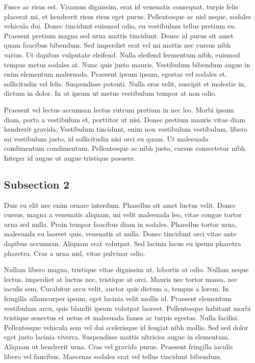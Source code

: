Fusce ac risus est. Vivamus dignissim, erat id venenatis consequat, turpis felis placerat mi, et hendrerit risus risus
eget purus. Pellentesque ac nisl neque, sodales vehicula dui. Donec tincidunt euismod odio, eu vestibulum tellus pretium
eu. Praesent pretium magna sed urna mattis tincidunt. Donec id purus sit amet quam faucibus bibendum. Sed imperdiet erat
vel mi mattis nec cursus nibh varius. Ut dapibus vulputate eleifend. Nulla eleifend fermentum nibh, euismod tempus metus
sodales at. Nunc quis justo mauris. Vestibulum bibendum augue in enim elementum malesuada. Praesent ipsum ipsum, egestas
vel sodales et, sollicitudin vel felis. Suspendisse potenti. Nulla eros velit, suscipit et molestie in, dictum in dolor.
In ut ipsum ut metus vestibulum tempor at non odio.

Praesent vel lectus accumsan lectus rutrum pretium in nec leo. Morbi ipsum diam, porta a vestibulum et, porttitor ut
nisi. Donec pretium mauris vitae diam hendrerit gravida. Vestibulum tincidunt, enim non vestibulum vestibulum, libero mi
vestibulum justo, id sollicitudin nisi orci eu quam. Ut malesuada condimentum condimentum. Pellentesque ac nibh justo,
cursus consectetur nibh. Integer id augue ut augue tristique posuere.

\subsection{Subsection 2}
Duis eu elit nec enim ornare interdum. Phasellus sit amet luctus velit. Donec cursus, magna a venenatis aliquam, mi
velit malesuada leo, vitae congue tortor urna sed nulla. Proin tempor faucibus diam in sodales. Phasellus tortor urna,
malesuada eu laoreet quis, venenatis at nulla. Donec tincidunt orci vitae ante dapibus accumsan. Aliquam erat volutpat.
Sed lacinia lacus eu ipsum pharetra pharetra. Cras a urna nisl, vitae pulvinar odio.

Nullam libero magna, tristique vitae dignissim ut, lobortis at odio. Nullam neque lectus, imperdiet at luctus nec,
tristique at orci. Mauris nec tortor massa, nec iaculis sem. Curabitur arcu velit, auctor quis dictum a, tempus a lorem.
In fringilla ullamcorper ipsum, eget lacinia velit mollis id. Praesent elementum vestibulum arcu, quis blandit ipsum
volutpat laoreet. Pellentesque habitant morbi tristique senectus et netus et malesuada fames ac turpis egestas. Nulla
facilisi. Pellentesque vehicula sem vel dui scelerisque id feugiat nibh mollis. Sed sed dolor eget justo lacinia
viverra. Suspendisse mattis ultricies augue in elementum. Aliquam ut hendrerit urna. Cras vel gravida purus. Praesent
fringilla iaculis libero vel faucibus. Maecenas sodales erat vel tellus tincidunt bibendum.


